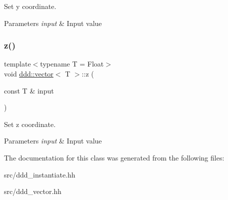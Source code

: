 Set y coordinate. 


\begin{DoxyParams}{Parameters}
{\em input} & Input value \\
\hline
\end{DoxyParams}
\mbox{\label{classddd_1_1vector_a998ea9276d8f3c706b98d4eab9ebcaf3}} 
\subsubsection{\texorpdfstring{z()}{z()}}
{\footnotesize\ttfamily template$<$typename T = Float$>$ \\
void \hyperlink{classddd_1_1vector}{ddd\+::vector}$<$ T $>$\+::z (\begin{DoxyParamCaption}\item[{const T \&}]{input }\end{DoxyParamCaption})\hspace{0.3cm}{\ttfamily [inline]}}



Set z coordinate. 


\begin{DoxyParams}{Parameters}
{\em input} & Input value \\
\hline
\end{DoxyParams}


The documentation for this class was generated from the following files\+:\begin{DoxyCompactItemize}
\item 
src/ddd\+\_\+instantiate.\+hh\item 
src/ddd\+\_\+vector.\+hh\end{DoxyCompactItemize}
